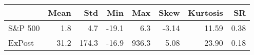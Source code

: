 \begin{tabular}{lrrrrrrr}
\hline
         &   Mean &   Std &   Min &   Max &   Skew &   Kurtosis &   SR \\
\hline
 S\&P 500 &    1.8 &   4.7 & -19.1 &   6.3 &  -3.14 &      11.59 & 0.38 \\
 ExPost  &   31.2 & 174.3 & -16.9 & 936.3 &   5.08 &      23.90 & 0.18 \\
\hline
\end{tabular}